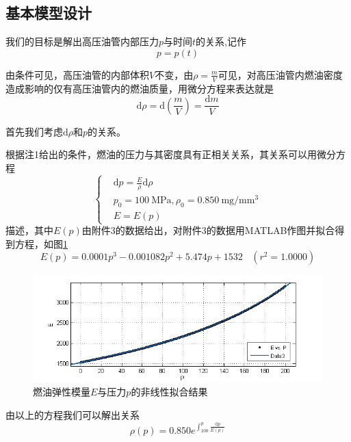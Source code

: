 \documentclass[12pt,AutoFakeBold]{article}%
\newcommand{\dif}{\mathrm{d}}
\begin{document}
    \subsection{基本模型设计}
    我们的目标是解出高压油管内部压力$p$与时间$t$的关系,记作
    \begin{equation}
        p=p(t)
    \end{equation}
    \par
    由条件可见，高压油管的内部体积$V$不变，由$\rho=\frac{m}{V}$可见，对高压油管内燃油密度造成影响的仅有高压油管内的燃油质量，用微分方程来表达就是
    \begin{equation}
        \dif\rho=\dif\left(\frac{m}{V}\right)=\frac{\dif m}{V}
        \label{eq1}
    \end{equation}
    \par
    首先我们考虑$\dif\rho$和$p$的关系。\par
    根据注1给出的条件，燃油的压力与其密度具有正相关关系，其关系可以用微分方程
    \begin{equation}
         \begin{cases}
            &\dif p=\frac{E}{\rho}\dif\rho\\
            &p_0=\SI{100}{\MPa},\rho_0=\SI{0.850}{\mg\per\cubic\mm}\\
            &E=E(p)
        \end{cases}
        \label{pandrho}
    \end{equation}
    描述，其中$E(p)$由附件3的数据给出，对附件3的数据用MATLAB作图并拟合得到方程，如图\ref{data3}
    \begin{equation}
        E(p)=0.0001p^3-0.001082p^2+5.474p+1532\ \ \ \ (r^2=1.0000)
    \end{equation}
    \begin{figure}[H]
        \centering
        \includegraphics[scale=0.8]{figure/data3.png}
        \caption{燃油弹性模量$E$与压力$p$的非线性拟合结果}
        \label{data3}
    \end{figure}
    由以上的方程我们可以解出关系
    \begin{equation}
        \rho(p)=0.850e^{\int^p_{100}\frac{\dif p}{E(p)}}
        \label{eq2}
    \end{equation}
\end{document}
